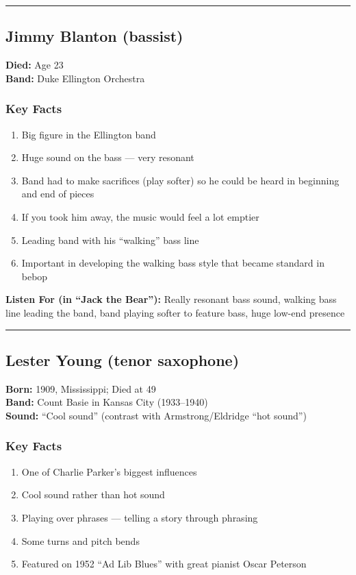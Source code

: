 \documentclass[11pt, letterpaper]{article}
\begin{document}
\bigskip
\textcolor{rulecolor}{\rule{\textwidth}{0.2pt}}

\subsection{Jimmy Blanton (bassist)}

\textbf{Died:} Age 23\\
\textbf{Band:} Duke Ellington Orchestra

\subsubsection*{Key Facts}
\begin{enumerate}
    \item Big figure in the Ellington band
    \item Huge sound on the bass --- very resonant
    \item Band had to make sacrifices (play softer) so he could be heard in beginning and end of pieces
    \item If you took him away, the music would feel a lot emptier
    \item Leading band with his ``walking'' bass line
    \item Important in developing the walking bass style that became standard in bebop
\end{enumerate}

\textbf{Listen For (in ``Jack the Bear''):} Really resonant bass sound, walking bass line leading the band, band playing softer to feature bass, huge low-end presence

\bigskip
\textcolor{rulecolor}{\rule{\textwidth}{0.2pt}}

\subsection{Lester Young (tenor saxophone)}

\textbf{Born:} 1909, Mississippi; Died at 49\\
\textbf{Band:} Count Basie in Kansas City (1933--1940)\\
\textbf{Sound:} ``Cool sound'' (contrast with Armstrong/Eldridge ``hot sound'')

\subsubsection*{Key Facts}
\begin{enumerate}
    \item One of Charlie Parker's biggest influences
    \item Cool sound rather than hot sound
    \item Playing over phrases --- telling a story through phrasing
    \item Some turns and pitch bends
    \item Featured on 1952 ``Ad Lib Blues'' with great pianist Oscar Peterson
\end{enumerate}
\end{document}
